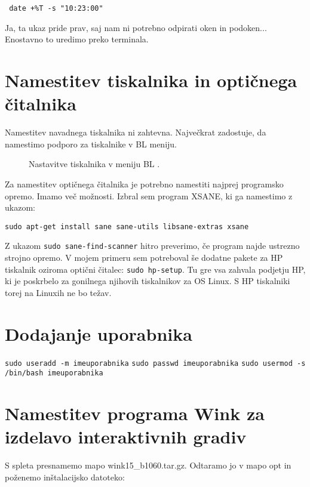 \documentclass[12pt,a4paper,twoside]{article}
\begin{document}
\texttt{ date +\%T -s "10:23:00"}

Ja, ta ukaz pride prav, saj nam ni potrebno odpirati oken in podoken... Enostavno to uredimo preko terminala. 

\section{Namestitev tiskalnika in optičnega čitalnika}
Namestitev navadnega tiskalnika ni zahtevna. Največkrat zadostuje, da namestimo podporo za tiskalnike v BL meniju. 

\begin{figure}[h!] \centering
{}
\caption{Nastavitve tiskalnika v meniju BL
\cite{rfstran}.}\label{slika:Nastavitve tiskalnika v meniju BL}
\end{figure}

Za namestitev optičnega čitalnika je potrebno namestiti najprej programsko opremo. Imamo več možnosti. Izbral sem program XSANE, ki ga namestimo z ukazom:


\texttt{sudo apt-get install sane sane-utils libsane-extras xsane}


Z ukazom \texttt{sudo sane-find-scanner} hitro preverimo, če program najde ustrezno strojno opremo. V mojem primeru sem potreboval še dodatne pakete za HP tiskalnik oziroma optični čitalec: \texttt{sudo hp-setup}. Tu gre vsa zahvala podjetju HP, ki je poskrbelo za gonilnega njihovih tiskalnikov za OS Linux. S HP tiskalniki torej na Linuxih ne bo težav.



\section{Dodajanje uporabnika}

\texttt{sudo useradd -m imeuporabnika}\linebreak 
\texttt{sudo passwd imeuporabnika}\linebreak 
\texttt{sudo usermod -s /bin/bash imeuporabnika}



\newpage
\section{Namestitev programa Wink za izdelavo interaktivnih gradiv}

S spleta presnamemo mapo wink15\_b1060.tar.gz. Odtaramo jo v mapo opt in poženemo inštalacijsko datoteko:
\end{document}
